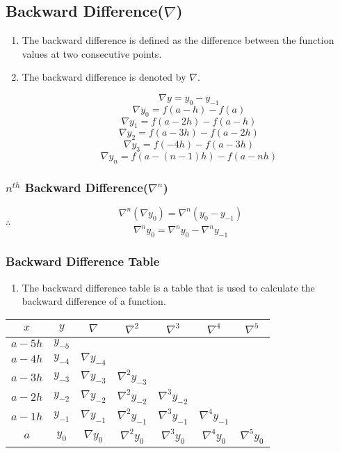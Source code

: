 

\subsection{Backward Difference($\nabla$)}

\begin{enumerate}
  \item The backward difference is defined as the difference between the function values at two consecutive points.
  \item The backward difference is denoted by $\nabla$.

  \[\nabla y = y_0 - {y}_{-1}\]
  \[\nabla y_0 = f(a-h) - f(a)\]
  \[\nabla y_1 = f(a-2h) - f(a-h)\]
  \[\nabla y_2 = f(a-3h) - f(a-2h)\]
  \[\nabla y_3 = f(-4h) - f(a-3h)\]
  \[\nabla y_n = f(a-(n-1)h) - f(a-nh)\]

\end{enumerate}

\subsubsection{$n^{th}$ Backward Difference($\nabla^n$)}

\[\nabla^n(\nabla y_0) = \nabla^n(y_0 - y_{-1})\]
$\therefore$ \[\nabla^n y_0 = \nabla^n y_0 - \nabla^n y_{-1}\]


\subsubsection{Backward Difference Table}

\begin{enumerate}
  \item The backward difference table is a table that is used to calculate the backward difference of a function.
\end{enumerate}

\begin{center}
\begin{tabular}{|c|c|c|c|c|c|c|}
    \hline
    $x$ & $y$ & $\nabla$ & $\nabla^2$ & $\nabla^3$ & $\nabla^4$ & $\nabla^5$\\
    \hline
    $a - 5h$ & ${y}_{-5}$ & & & & &\\
    \hline
    $a - 4h$ & ${y}_{-4}$ & $\nabla {y}_{-4}$ & & & &\\
    \hline
    $a - 3h$ & ${y}_{-3}$ & $\nabla {y}_{-3}$ & $\nabla^2 {y}_{-3}$ & & &\\
    \hline
    $a - 2h$ & ${y}_{-2}$ & $\nabla {y}_{-2}$ & $\nabla^2 y_{-2}$ & $\nabla^3 y_{-2}$ & &\\
    \hline
    $a - 1h$ & ${y}_{-1}$ & $\nabla {y}_{-1}$ & $\nabla^2 y_{-1}$ & $\nabla^3 y_{-1}$ & $\nabla^4 {y}_{-1}$ &\\
    \hline
    $a$ & $y_0$ & $\nabla y_0$ & $\nabla^2 y_0$ & $\nabla^3 y_0$ & $\nabla^4 y_0$ & $\nabla^5 y_0$\\
    \hline
\end{tabular}
\end{center}
